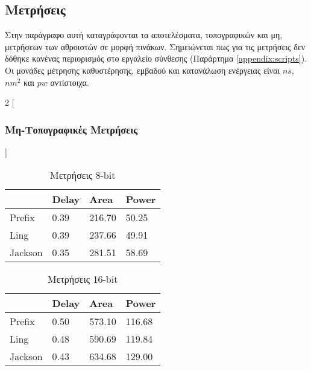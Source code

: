 \clearpage
\subsection{Μετρήσεις}
Στην παράγραφο αυτή καταγράφονται τα αποτελέσματα, τοπογραφικών και μη, μετρήσεων των αθροιστών σε μορφή πινάκων. Σημειώνεται πως για τις μετρήσεις δεν δόθηκε κανένας περιορισμός στο εργαλείο σύνθεσης (Παράρτημα \ref{appendix:scripts}). Οι μονάδες μέτρησης καθυστέρησης, εμβαδού και κατανάλωση ενέργειας είναι $ns$, $nm^2$ και $pw$ αντίστοιχα.
\begin{multicols}{2}
[\subsubsection{Μη-Τοπογραφικές Μετρήσεις}]
\begin{table}[H]
\centering
     \begin{tabular}{||p{1.2cm} | p{0.7cm}  p{1cm}  p{1cm} ||} 
        \hline
         & Delay & Area & Power \\ [0.5ex] 
        \hline\hline
        Prefix  & 0.39  & 216.70    & 50.25 \\ 
        \hline
        Ling    & 0.39  & 237.66    & 49.91 \\
        \hline
        Jackson & 0.35  & 281.51    & 58.69 \\
        \hline
    \end{tabular}
\caption{Μετρήσεις 8-bit}
\label{result_table_8}
\end{table}
\begin{table}[H]
\centering
     \begin{tabular}{||p{1.2cm} | p{0.7cm} p{1cm} p{1cm} ||} 
        \hline
        & Delay & Area & Power \\ [0.5ex] 
        \hline\hline
        Prefix  & 0.50  & 573.10    & 116.68 \\ 
        \hline
        Ling    & 0.48  & 590.69    & 119.84 \\
        \hline
        Jackson & 0.43  & 634.68    & 129.00 \\
        \hline
    \end{tabular}
\caption{Μετρήσεις 16-bit}
\label{result_table_16}
\end{table}
\begin{table}[H]

\end{table}
\end{multicols}
